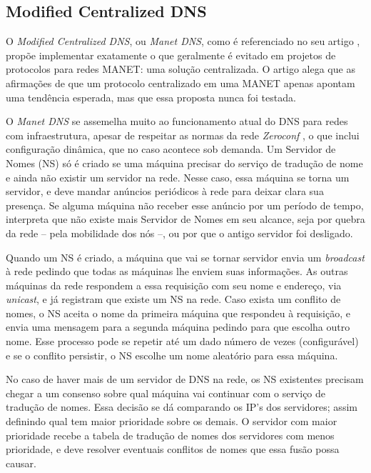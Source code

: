 \subsection{Modified Centralized DNS}
\label{MCDNS}

    O \textit{Modified Centralized DNS}, ou \textit{Manet DNS}, como é referenciado
    no seu artigo \cite{mcdns}, propõe implementar exatamente o que geralmente é
    evitado em projetos de protocolos para redes MANET: uma solução centralizada.
    O artigo alega que as afirmações de que um protocolo centralizado em uma MANET
    apenas apontam uma tendência esperada, mas que essa proposta nunca foi testada.
  
    O \textit{Manet DNS} se assemelha muito ao funcionamento atual do DNS para 
    redes com infraestrutura, apesar de respeitar as normas da rede \textit{Zeroconf}
    \cite{zeroconf}, o que inclui configuração dinâmica, que no caso acontece sob
    demanda. Um Servidor de Nomes (NS) só é criado se uma máquina precisar do 
    serviço de tradução de nome e ainda não existir um servidor na rede. Nesse 
    caso, essa máquina se torna um servidor, e deve mandar anúncios periódicos à
    rede para deixar clara sua presença. Se alguma máquina não receber esse
    anúncio por um período de tempo, interpreta que não existe mais Servidor de 
    Nomes em seu alcance, seja por quebra da rede -- pela mobilidade dos nós --,
    ou por que o antigo servidor foi desligado.
  
    Quando um NS é criado, a máquina que vai se tornar servidor envia um 
    \textit{broadcast} à rede pedindo que todas as máquinas lhe enviem suas 
    informações. As outras máquinas da rede respondem a essa requisição com seu 
    nome e endereço, via \textit{unicast}, e já registram que existe um NS na rede.
    Caso exista um conflito de nomes, o NS aceita o nome da primeira máquina que
    respondeu à requisição, e envia uma mensagem para a segunda máquina pedindo
    para que escolha outro nome. Esse processo pode se repetir até um dado número
    de vezes (configurável) e se o conflito persistir, o NS escolhe um nome 
    aleatório para essa máquina.
  
    No caso de haver mais de um servidor de DNS na rede, os NS existentes precisam
    chegar a um consenso sobre qual máquina vai continuar com o serviço de tradução
    de nomes. Essa decisão se dá comparando os IP's dos servidores; assim definindo
    qual tem maior prioridade sobre os demais. O servidor com maior prioridade recebe
    a tabela de tradução de nomes dos servidores com menos prioridade, e deve resolver
    eventuais conflitos de nomes que essa fusão possa causar.
  
